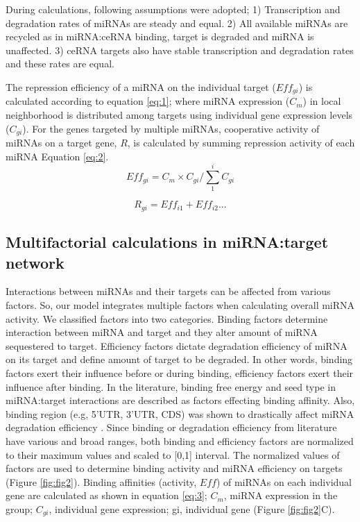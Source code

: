 \documentclass[a4,center,fleqn]{NAR}
\begin{document}
During calculations, following assumptions were adopted; 1)
Transcription and degradation rates of miRNAs are steady and equal. 2)
All available miRNAs are recycled as in miRNA:ceRNA binding, target is
degraded and miRNA is unaffected. 3) ceRNA targets also have stable
transcription and degradation rates and these rates are equal.

The repression efficiency of a miRNA on the individual target
(\(Eff_{gi}\)) is calculated according to equation \eqref{eq:1}; where
miRNA expression (\(C_m\)) in local neighborhood is distributed among
targets using individual gene expression levels (\(C_{gi}\)). For the
genes targeted by multiple miRNAs, cooperative activity of miRNAs on a
target gene, \(R\), is calculated by summing repression activity of each
miRNA Equation \eqref{eq:2}. \begin{equation*} 
    Eff_{gi}= C_m \times C_{gi}/\sum_{1}^{i} C_{gi} \tag{1}\label{eq:1}
\end{equation*}

\begin{equation*}
   R_{gi}= Eff_{i1} + Eff_{i2} ... \tag{2}\label{eq:2}
\end{equation*}

\subsection{Multifactorial calculations in miRNA:target network}

Interactions between miRNAs and their targets can be affected from
various factors. So, our model integrates multiple factors when
calculating overall miRNA activity. We classified factors into two
categories. Binding factors determine interaction between miRNA and
target and they alter amount of miRNA sequestered to target. Efficiency
factors dictate degradation efficiency of miRNA on its target and define
amount of target to be degraded. In other words, binding factors exert
their influence before or during binding, efficiency factors exert their
influence after binding. In the literature, binding free energy
\citep{cao_predicting_2012, helwak_mapping_2013} and seed type
\citep{werfel_preferential_2017} in miRNA:target interactions are
described as factors effecting binding affinity. Also, binding region
(e.g, 5'UTR, 3'UTR, CDS) was shown to drastically affect miRNA
degradation efficiency
\citep{hausser_analysis_2013, helwak_mapping_2013}. Since binding or
degradation efficiency from literature have various and broad ranges,
both binding and efficiency factors are normalized to their maximum
values and scaled to {[}0,1{]} interval. The normalized values of
factors are used to determine binding activity and miRNA efficiency on
targets (Figure \ref{fig:fig2}). Binding affinities (activity, \(Eff\))
of miRNAs on each individual gene are calculated as shown in equation
\eqref{eq:3}; \(C_m\), miRNA expression in the group; \(C_{gi}\),
individual gene expression; gi, individual gene (Figure
\ref{fig:fig2}C).
\end{document}
